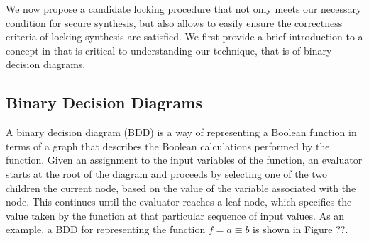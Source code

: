 
We now propose a candidate locking procedure that not only meets our necessary condition for secure synthesis, but also allows to easily ensure the correctness criteria of locking synthesis are satisfied. We first provide a brief introduction to a concept in  that is critical to understanding our technique, that is of binary decision diagrams. 

\subsection{Binary Decision Diagrams}
A binary decision diagram (BDD) is a way of representing a Boolean function in terms of a graph that describes the Boolean calculations performed by the function. Given an assignment to the input variables of the function, an evaluator starts at the root of the diagram and proceeds by selecting one of the two children the current node, based on the value of the variable associated with the node. This continues until the evaluator reaches a leaf node, which specifies the value taken by the function at that particular sequence of input values. As an example, a BDD for representing the function $f = a \equiv b$ is shown in Figure ??.

